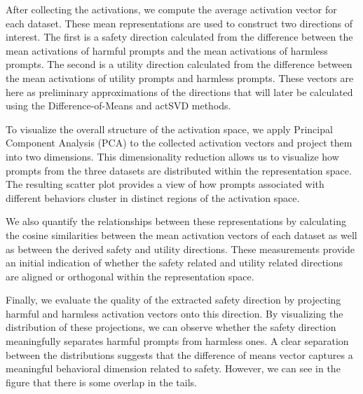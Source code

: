 After collecting the activations, we compute the average activation vector for each dataset. These mean representations are used to construct two directions of interest. The first is a safety direction calculated from the difference between the mean activations of harmful prompts and the mean activations of harmless prompts. The second is a utility direction calculated from the difference between the mean activations of utility prompts and harmless prompts. These vectors are here as preliminary approximations of the directions that will later be calculated using the Difference-of-Means and actSVD methods.

To visualize the overall structure of the activation space, we apply Principal Component Analysis (PCA) to the collected activation vectors and project them into two dimensions. This dimensionality reduction allows us to visualize how prompts from the three datasets are distributed within the representation space. The resulting scatter plot provides a view of how prompts associated with different behaviors cluster in distinct regions of the activation space. 

We also quantify the relationships between these representations by calculating the cosine similarities between the mean activation vectors of each dataset as well as between the derived safety and utility directions. These measurements provide an initial indication of whether the safety related and utility related directions are aligned or orthogonal within the representation space.

Finally, we evaluate the quality of the extracted safety direction by projecting harmful and harmless activation vectors onto this direction. By visualizing the distribution of these projections, we can observe whether the safety direction meaningfully separates harmful prompts from harmless ones. A clear separation between the distributions suggests that the difference of means vector captures a meaningful behavioral dimension related to safety. However, we can see in the figure that there is some overlap in the tails.
